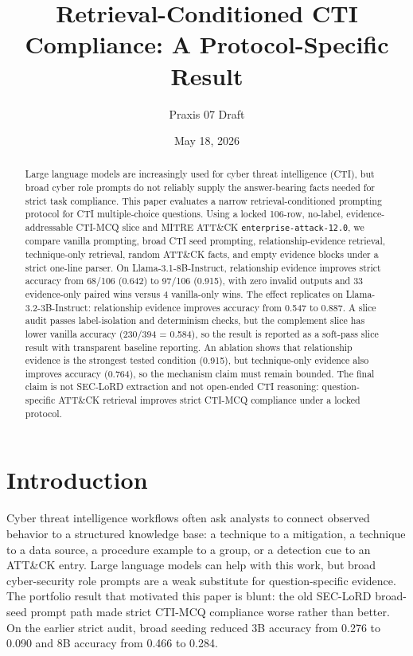 \documentclass[10pt]{article}
\title{Retrieval-Conditioned CTI Compliance: A Protocol-Specific Result}
\author{Praxis 07 Draft}
\date{May 18, 2026}
\begin{document}
\maketitle

\begin{abstract}
Large language models are increasingly used for cyber threat intelligence (CTI), but broad cyber role prompts do not reliably supply the answer-bearing facts needed for strict task compliance.
This paper evaluates a narrow retrieval-conditioned prompting protocol for CTI multiple-choice questions.
Using a locked 106-row, no-label, evidence-addressable CTI-MCQ slice and MITRE ATT\&CK \texttt{enterprise-attack-12.0}, we compare vanilla prompting, broad CTI seed prompting, relationship-evidence retrieval, technique-only retrieval, random ATT\&CK facts, and empty evidence blocks under a strict one-line parser.
On Llama-3.1-8B-Instruct, relationship evidence improves strict accuracy from 68/106 (0.642) to 97/106 (0.915), with zero invalid outputs and 33 evidence-only paired wins versus 4 vanilla-only wins.
The effect replicates on Llama-3.2-3B-Instruct: relationship evidence improves accuracy from 0.547 to 0.887.
A slice audit passes label-isolation and determinism checks, but the complement slice has lower vanilla accuracy (230/394 = 0.584), so the result is reported as a soft-pass slice result with transparent baseline reporting.
An ablation shows that relationship evidence is the strongest tested condition (0.915), but technique-only evidence also improves accuracy (0.764), so the mechanism claim must remain bounded.
The final claim is not SEC-LoRD extraction and not open-ended CTI reasoning: question-specific ATT\&CK retrieval improves strict CTI-MCQ compliance under a locked protocol.
\end{abstract}
\fi

\section{Introduction}

Cyber threat intelligence workflows often ask analysts to connect observed behavior to a structured knowledge base: a technique to a mitigation, a technique to a data source, a procedure example to a group, or a detection cue to an ATT\&CK entry.
Large language models can help with this work, but broad cyber-security role prompts are a weak substitute for question-specific evidence.
The portfolio result that motivated this paper is blunt: the old SEC-LoRD broad-seed prompt path made strict CTI-MCQ compliance worse rather than better.
On the earlier strict audit, broad seeding reduced 3B accuracy from 0.276 to 0.090 and 8B accuracy from 0.466 to 0.284.
\end{document}

